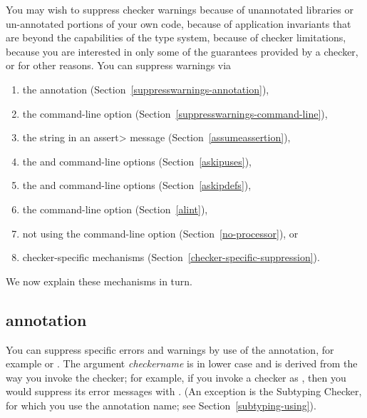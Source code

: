You may wish to suppress checker warnings because of unannotated libraries
or un-annotated portions of your own code, because of application
invariants that are beyond the capabilities of the type system, because of
checker limitations, because you are interested in only some of the
guarantees provided by a checker, or for other reasons.  You can suppress
warnings via
\begin{enumerate}
\item
  the  annotation (Section~\ref{suppresswarnings-annotation}),
\item
  the  command-line option (Section~\ref{suppresswarnings-command-line}),
\item
  the  string in an \<assert> message (Section~\ref{assumeassertion}),
\item
  the  and  command-line options (Section~\ref{askipuses}),
\item
  the  and  command-line options (Section~\ref{askipdefs}),
\item
  the  command-line option (Section~\ref{alint}),
\item
  not using the  command-line option (Section~\ref{no-processor}), or
\item
  checker-specific mechanisms (Section~\ref{checker-specific-suppression}).
\end{enumerate}

\noindent
We now explain these mechanisms in turn.


\subsection{ annotation\label{suppresswarnings-annotation}}

You can suppress specific errors and warnings by use of the
 annotation, for example
 or .
The argument \emph{checkername} is in lower case and is derived from the
way you invoke the checker; for example, if you invoke a checker as
, then you would suppress its
error messages with .  (An exception is
the Subtyping Checker, for which you use the annotation name; see
Section~\ref{subtyping-using}).

